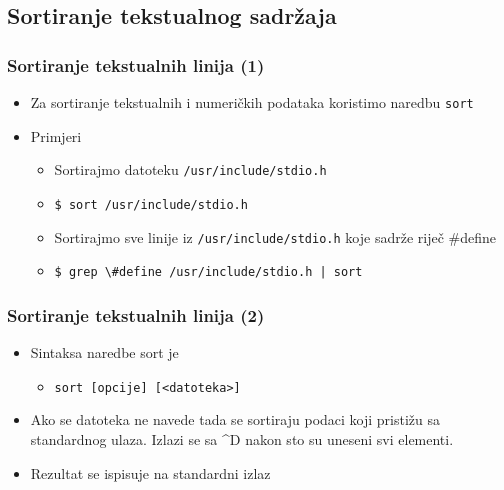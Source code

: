 \documentclass{beamer}
\newcommand{\shell}[1]{\texttt{#1}}
\begin{document}
\subsection{Sortiranje tekstualnog sadržaja}
\begin{frame}[t]
\frametitle{Sortiranje tekstualnih linija (1)}
\begin{itemize}
  \item Za sortiranje tekstualnih i numeričkih podataka koristimo naredbu
        \shell{sort}
  \item Primjeri
  \begin{itemize}
    \item Sortirajmo datoteku \shell{/usr/include/stdio.h}
    \item[] \shell{\$ sort /usr/include/stdio.h}
    \item Sortirajmo sve linije iz \shell{/usr/include/stdio.h} koje sadrže
          riječ \#define
    \item[] \shell{\$ grep \textbackslash{}\#define /usr/include/stdio.h |
                   sort}
  \end{itemize}
\end{itemize}
\end{frame}

\begin{frame}[t]
\frametitle{Sortiranje tekstualnih linija (2)}
\begin{itemize}
  \item Sintaksa naredbe sort je
  \begin{itemize}
    \item[] \shell{sort [opcije] [<datoteka>]}
  \end{itemize}
  \item Ako se datoteka ne navede tada se sortiraju podaci koji pristižu sa
        standardnog ulaza. Izlazi se sa  \^{}D  nakon sto su uneseni svi elementi.
  \item Rezultat se ispisuje na standardni izlaz
\end{itemize}
\end{frame}
\end{document}
